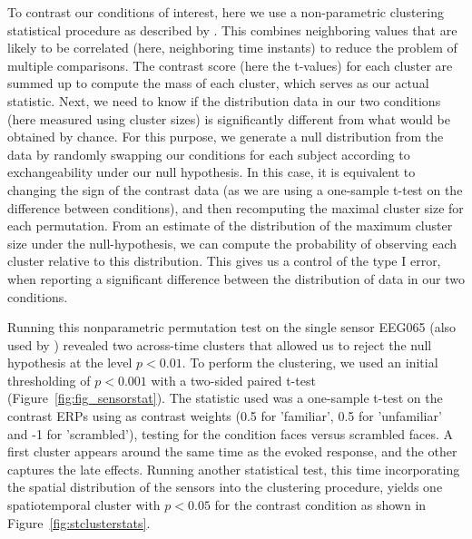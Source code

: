 To contrast our conditions of interest, here we use a non-parametric clustering statistical procedure as described by \cite{maris_nonparametric_2007}. This combines neighboring values that are likely to be correlated (here, neighboring time instants) to reduce the problem of multiple comparisons. The contrast score (here the  t-values) for each cluster are summed up to compute the mass of each cluster, which serves as our actual statistic. Next, we need to know if the distribution data in our two conditions (here measured using cluster sizes) is significantly different from what would be obtained by chance. For this purpose, we generate a null distribution from the data by randomly swapping our conditions for each subject according to exchangeability under our null hypothesis. In this case, it is equivalent to changing the sign of the contrast data (as we are using a one-sample t-test on the difference between conditions), and then recomputing the maximal cluster size for each permutation. From an estimate of the distribution of the maximum cluster size under the null-hypothesis, we can compute the probability of observing each cluster relative to this distribution. This gives us a control of the type I error, when reporting a significant difference between the distribution of data in our two conditions.

Running this nonparametric permutation test on the single sensor EEG065 (also used by \cite{wakeman2015multi}) revealed two across-time clusters that allowed us to reject the null hypothesis at the level $p < 0.01$. To perform the clustering, we used an initial thresholding of $p < 0.001$ with a two-sided paired t-test (Figure~\ref{fig:fig_sensorstat}). The statistic used was a one-sample t-test on the contrast ERPs using as contrast weights (0.5 for 'familiar', 0.5 for 'unfamiliar' and -1 for 'scrambled'), testing for the condition faces versus scrambled faces. A first cluster appears around the same time as the evoked response, and the other captures the late effects. Running another statistical test, this time incorporating the spatial distribution of the sensors into the clustering procedure, yields one spatiotemporal cluster with $p < 0.05$ for the contrast condition as shown in Figure~\ref{fig:stclusterstats}.

